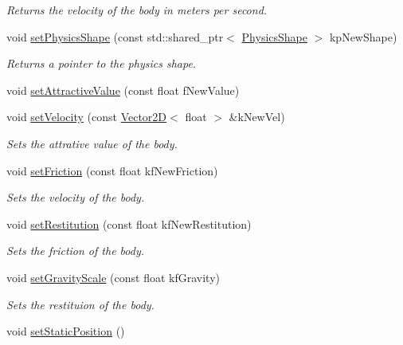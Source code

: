 \begin{DoxyCompactItemize}
\begin{DoxyCompactList}\small\item\em Returns the velocity of the body in meters per second. \end{DoxyCompactList}\item 
void \hyperlink{class_body2_d_aa15cf4fc66cbde8f72e48d95b84b0617}{set\+Physics\+Shape} (const std\+::shared\+\_\+ptr$<$ \hyperlink{class_physics_shape}{Physics\+Shape} $>$ kp\+New\+Shape)
\begin{DoxyCompactList}\small\item\em Returns a pointer to the physics shape. \end{DoxyCompactList}\item 
void \hyperlink{class_body2_d_ad3578491d07b2632e86b0c15eb398a92}{set\+Attractive\+Value} (const float f\+New\+Value)
\item 
void \hyperlink{class_body2_d_ae527f69a23d2e396d66044be6b36bc53}{set\+Velocity} (const \hyperlink{class_vector2_d}{Vector2\+D}$<$ float $>$ \&k\+New\+Vel)
\begin{DoxyCompactList}\small\item\em Sets the attrative value of the body. \end{DoxyCompactList}\item 
void \hyperlink{class_body2_d_a793004b49b70f1eddce4a38ad1335d7f}{set\+Friction} (const float kf\+New\+Friction)
\begin{DoxyCompactList}\small\item\em Sets the velocity of the body. \end{DoxyCompactList}\item 
void \hyperlink{class_body2_d_a3c277f1520ac8724bf73db4f20928c66}{set\+Restitution} (const float kf\+New\+Restitution)
\begin{DoxyCompactList}\small\item\em Sets the friction of the body. \end{DoxyCompactList}\item 
void \hyperlink{class_body2_d_ad7afbaa626aa98692227a806551ad62e}{set\+Gravity\+Scale} (const float kf\+Gravity)
\begin{DoxyCompactList}\small\item\em Sets the restituion of the body. \end{DoxyCompactList}\item 
\hypertarget{class_body2_d_a72e770d9b06aafd6c87c07b4b8fd3c88}{void \hyperlink{class_body2_d_a72e770d9b06aafd6c87c07b4b8fd3c88}{set\+Static\+Position} ()}\label{class_body2_d_a72e770d9b06aafd6c87c07b4b8fd3c88}


\end{DoxyCompactItemize}
